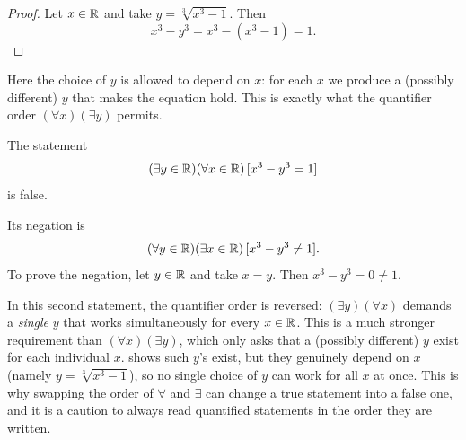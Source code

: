 \begin{proof}
    Let $x\in\mathbb{R}$ and take $y=\sqrt[3]{x^3-1}$. Then
    \begin{equation*}
        x^3-y^3=x^3-(x^3-1)=1.
    \end{equation*}
\end{proof}

Here the choice of $y$ is allowed to depend on $x$: for each $x$ we produce a (possibly different) $y$ that makes the equation hold. This is exactly what the quantifier order $(\forall x)(\exists y)$ permits.

\begin{proposition}\label{prop:reversed-order-false}
    The statement
    \begin{equation*}
        (\exists y\in\mathbb{R})(\forall x\in\mathbb{R})\,[x^3-y^3=1]
    \end{equation*}
    is false.

    Its negation is
    \begin{equation*}
        (\forall y\in\mathbb{R})(\exists x\in\mathbb{R})\,[x^3-y^3\neq 1].
    \end{equation*}
    To prove the negation, let $y\in\mathbb{R}$ and take $x=y$. Then
    $x^3-y^3=0\neq 1$.
\end{proposition}

\begin{remark}
    In this second statement, the quantifier order is reversed: $(\exists y)(\forall x)$ demands a \emph{single} $y$ that works simultaneously for every $x\in\mathbb{R}$. This is a much stronger requirement than $(\forall x)(\exists y)$, which only asks that a (possibly different) $y$ exist for each individual $x$.  shows such $y$'s exist, but they genuinely depend on $x$ (namely $y=\sqrt[3]{x^3-1}$), so no single choice of $y$ can work for all $x$ at once. This is why swapping the order of $\forall$ and $\exists$ can change a true statement into a false one, and it is a caution to always read quantified statements in the order they are written.
\end{remark}
